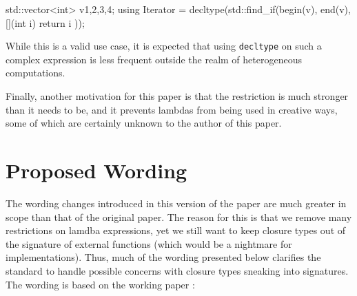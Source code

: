 \documentclass[11pt]{article}
\newcommand{\cc}[1]{\texttt{#1}}
\begin{document}
\begin{cpp}
std::vector<int> v{1,2,3,4};
using Iterator = decltype(std::find_if(begin(v), end(v), [](int i) {
  return i %
}));
\end{cpp}

While this is a valid use case, it is expected that using \cc{decltype} on
such a complex expression is less frequent outside the realm of heterogeneous
computations.

Finally, another motivation for this paper is that the restriction is much stronger
than it needs to be, and it prevents lambdas from being used in creative ways,
some of which are certainly unknown to the author of this paper.


\section{Proposed Wording}
The wording changes introduced in this version of the paper are much greater in
scope than that of the original paper. The reason for this is that we remove
many restrictions on lamdba expressions, yet we still want to keep closure types
out of the signature of external functions (which would be a nightmare for
implementations). Thus, much of the wording presented below clarifies the
standard to handle possible concerns with closure types sneaking into signatures.
The wording is based on the working paper \cite{N4606}:
\end{document}
